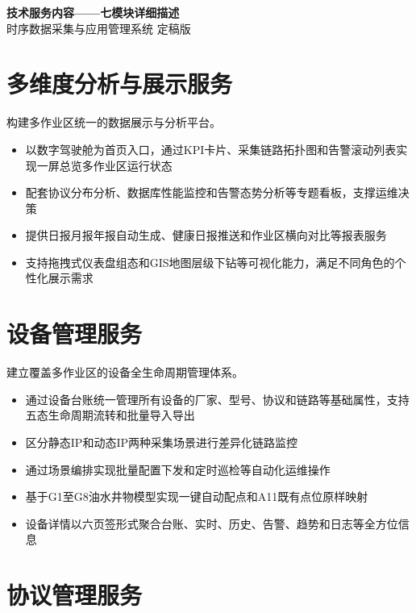 \documentclass[11pt,a4paper]{ctexart}
\begin{document}
\begin{center}
{\Huge\bfseries\color{pri}技术服务内容——七模块详细描述}\\[6pt]
{\large 时序数据采集与应用管理系统  定稿版}
\end{center}
\vspace{1em}\hrulefill\vspace{1em}

\section{多维度分析与展示服务}

构建多作业区统一的数据展示与分析平台。

\begin{itemize}[leftmargin=*]
  \item 以数字驾驶舱为首页入口，通过KPI卡片、采集链路拓扑图和告警滚动列表实现一屏总览多作业区运行状态
  \item 配套协议分布分析、数据库性能监控和告警态势分析等专题看板，支撑运维决策
  \item 提供日报月报年报自动生成、健康日报推送和作业区横向对比等报表服务
  \item 支持拖拽式仪表盘组态和GIS地图层级下钻等可视化能力，满足不同角色的个性化展示需求
\end{itemize}

\section{设备管理服务}

建立覆盖多作业区的设备全生命周期管理体系。

\begin{itemize}[leftmargin=*]
  \item 通过设备台账统一管理所有设备的厂家、型号、协议和链路等基础属性，支持五态生命周期流转和批量导入导出
  \item 区分静态IP和动态IP两种采集场景进行差异化链路监控
  \item 通过场景编排实现批量配置下发和定时巡检等自动化运维操作
  \item 基于G1至G8油水井物模型实现一键自动配点和A11既有点位原样映射
  \item 设备详情以六页签形式聚合台账、实时、历史、告警、趋势和日志等全方位信息
\end{itemize}

\section{协议管理服务}
\end{document}
